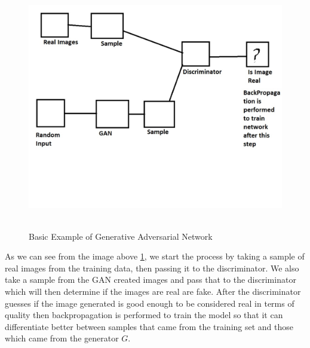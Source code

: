 \begin{figure}[H]
    \centering
    \includegraphics[width=1\textwidth,height=10cm]{Images/GAN Basic.jpg}\\
    \caption{Basic Example of Generative Adversarial Network}
    \label{fig:Example GAN Diagram}
\end{figure}
\vspace{0.5mm}
As we can see from the image above \ref{fig:Example GAN Diagram}, we start the process by taking a sample of real images from the training data, then passing it to the discriminator. We also take a sample from the GAN created images and pass that to the discriminator which will then determine if the images are real are fake.  After the discriminator guesses if the image generated is good enough to be considered real in terms of quality then backpropagation is performed to train the model so that it can differentiate better between samples that came from the training set and those which came from the generator $G$.
